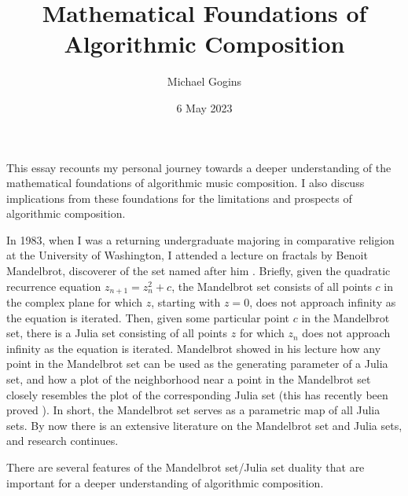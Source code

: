 \documentclass[11pt]{amsart}
\title{Mathematical Foundations of Algorithmic Composition}
\author{Michael Gogins}
\date{6 May 2023}                                           %
\begin{document}
\maketitle
This essay recounts my personal journey towards a deeper understanding of the mathematical foundations of algorithmic music composition. I also discuss  implications from these foundations for the limitations and prospects of algorithmic composition.

In 1983, when I was a returning undergraduate majoring in comparative religion at the University of Washington, I attended a lecture on fractals by Benoit Mandelbrot, discoverer of the set named after him \cite{citeulike:580392, peitgen2004mandelbrot}. Briefly, given the quadratic recurrence equation $z_{n+1} = z_n^2 + c$, the Mandelbrot set consists of all points $c$ in the complex plane for which $z$, starting with $z = 0$, does not approach infinity as the equation is iterated. Then, given some particular point $c$ in the Mandelbrot set, there is a Julia set consisting of all points $z$ for which $z_n$ does not approach infinity as the equation is iterated.  Mandelbrot showed in his lecture how any point in the Mandelbrot set can be used as the generating parameter of a Julia set, and how a plot of the neighborhood near a point in the Mandelbrot set closely resembles the plot of the corresponding Julia set \cite{lei1990similarity} (this has recently been proved \cite{kawahira2018julia}). In short, the Mandelbrot set serves as a parametric map of all Julia sets. By now there is an extensive literature on the Mandelbrot set and Julia sets, and research continues. 

There are several features of the Mandelbrot set/Julia set duality that are important for a deeper understanding of algorithmic composition.
\end{document}
